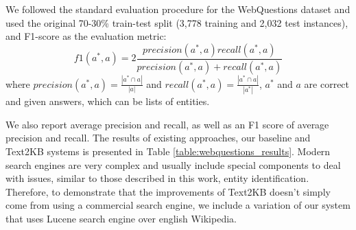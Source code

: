 We followed the standard evaluation procedure for the WebQuestions dataset and used the original 70-30\% train-test split (3,778 training and 2,032 test instances), and F1-score as the evaluation metric:
$$f1(a^*, a) = 2\frac{precision(a^*,a) recall(a^*,a)}{precision(a^*,a) + recall(a^*,a)}$$
where $precision(a^*, a)=\frac{|a^* \cap a|}{|a|}$ and $recall(a^*, a) = \frac{|a^* \cap a|}{|a^*|}$, $a^*$ and $a$ are correct and given answers, which can be lists of entities.

We also report average precision and recall, as well as an F1 score of average precision and recall.
The results of existing approaches, our baseline and Text2KB systems is presented in Table \ref{table:webquestions_results}.
Modern search engines are very complex and usually include special components to deal with issues, similar to those described in this work, \eg entity identification.
Therefore, to demonstrate that the improvements of Text2KB doesn't simply come from using a commercial search engine, we include a variation of our system that uses Lucene search engine over english Wikipedia.

